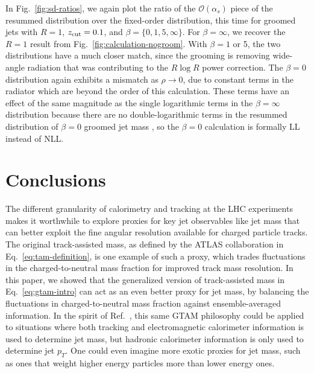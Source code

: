 \documentclass[letterpaper,11pt]{article}
\newcommand{\Ref}[1]{Ref.~\cite{#1}}
\newcommand{\Fig}[1]{Fig.~\ref{#1}}
\newcommand{\Eq}[1]{Eq.~\eqref{#1}}
\begin{document}
In \Fig{fig:sd-ratios}, we again plot the ratio of the $\mathcal{O}(\alpha_s)$ piece of the resummed distribution over the fixed-order distribution, this time for groomed jets with $R=1$, $z_{\rm cut} = 0.1$, and $\beta = \{0,1,5,\infty\}$. 
%
For $\beta = \infty$, we recover the $R=1$ result from \Fig{fig:calculation-nogroom}.
%
With $\beta = 1$ or 5, the two distributions have a much closer match, since the grooming is removing wide-angle radiation that was contributing to the $R \log R$ power correction.
%
The $\beta = 0$ distribution again exhibits a mismatch as $\rho \rightarrow 0$, due to constant terms in the radiator which are beyond the order of this calculation.
%
These terms have an effect of the same magnitude as the single logarithmic terms in the $\beta = \infty$ distribution because there are no double-logarithmic terms in the resummed distribution of $\beta = 0$ groomed jet mass \cite{Dasgupta:2013ihk}, so the $\beta = 0$ calculation is formally LL instead of NLL. 
















\section{Conclusions}
\label{sec:conclusion}

The different granularity of calorimetry and tracking at the LHC experiments makes it worthwhile to explore proxies for key jet observables like jet mass that can better exploit the fine angular resolution available for charged particle tracks. 
%
The original track-assisted mass, as defined by the ATLAS collaboration in \Eq{eq:tam-definition}, is one example of such a proxy, which trades fluctuations in the charged-to-neutral mass fraction for improved track mass resolution.
%
In this paper, we showed that the generalized version of track-assisted mass in \Eq{eq:gtam-intro} can act as an even better proxy for jet mass, by balancing the fluctuations in charged-to-neutral mass fraction against ensemble-averaged information.
%
In the spirit of \Ref{Coleman:2017fiq}, this same GTAM philosophy could be applied to situations where both tracking and electromagnetic calorimeter information is used to determine jet mass, but hadronic calorimeter information is only used to determine jet $p_T$.
%
One could even imagine more exotic proxies for jet mass, such as ones that weight higher energy particles more than lower energy ones.
\end{document}
